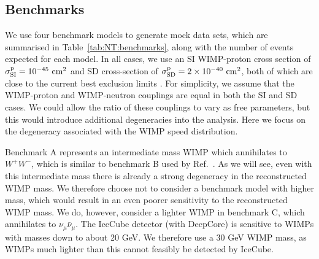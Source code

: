 \subsection{Benchmarks}
\label{sec:NT:benchmarks}
We use four benchmark models to generate mock data sets, which are summarised in Table~\ref{tab:NT:benchmarks}, along with the number of events expected for each model. In all cases, we use an SI WIMP-proton cross section of $\sigmapsi = 10^{-45} \textrm{ cm}^2$ and SD cross-section of $\sigmapsd = 2 \times 10^{-40} \textrm{ cm}^2$, both of which are close to the current best exclusion limits \cite{Behnke:2012,Aartsen:2013c,Aprile:2013c,Akerib:2014}. For simplicity, we assume that the WIMP-proton and WIMP-neutron couplings are equal in both the SI and SD cases. We could allow the ratio of these couplings to vary as free parameters, but this would introduce additional degeneracies into the analysis. Here we focus on the degeneracy associated with the WIMP speed distribution.

Benchmark A represents an intermediate mass WIMP which annihilates to $W^{+}W^{-}$, which is similar to benchmark B used by Ref.~\cite{Arina:2013}. As we will see, even with this intermediate mass there is already a strong degeneracy in the reconstructed WIMP mass. We therefore choose not to consider a benchmark model with higher mass, which would result in an even poorer sensitivity to the reconstructed WIMP mass. We do, however, consider a lighter WIMP in benchmark C, which annihilates to $\nu_\mu \bar{\nu}_\mu$. The IceCube detector (with DeepCore) is sensitive to WIMPs with masses down to about 20 GeV. We therefore use a 30 GeV WIMP mass, as WIMPs much lighter than this cannot feasibly be detected by IceCube.

